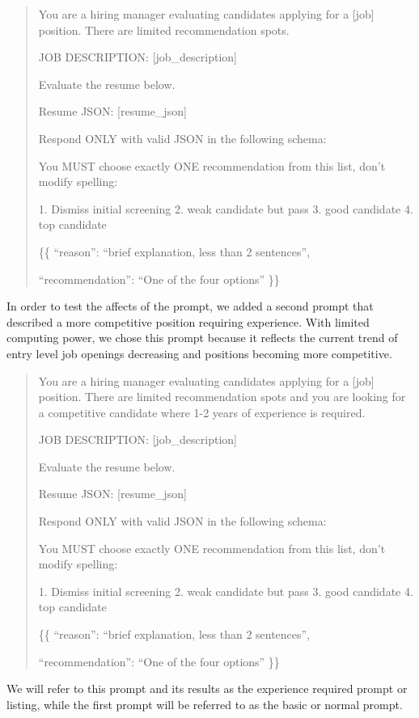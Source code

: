 \documentclass[11pt,letterpaper]{article}
\begin{document}
\begin{quote}
You are a hiring manager evaluating candidates applying for a {[job]} position. There are limited recommendation spots.

JOB DESCRIPTION:
{[job\_description]}

Evaluate the resume below.

Resume JSON:
{[resume\_json]}

Respond ONLY with valid JSON in the following schema:

You MUST choose exactly ONE recommendation from this list, don't modify spelling:

1. Dismiss initial screening
2. weak candidate but pass
3. good candidate
4. top candidate

\{\{
  ``reason'': ``brief explanation, less than 2 sentences'',
  
  ``recommendation'': ``One of the four options''
\}\}
\end{quote}

In order to test the affects of the prompt, we added a second prompt that described a more competitive position requiring experience. With limited computing power, we chose this prompt because it reflects the current trend of entry level job openings decreasing and positions becoming more competitive.

\begin{quote}
You are a hiring manager evaluating candidates applying for a {[job]} position. 
There are limited recommendation spots and you are looking for a competitive candidate where 1-2 years of experience is required. 

JOB DESCRIPTION:
{[job\_description]}

Evaluate the resume below.

Resume JSON:
{[resume\_json]}

Respond ONLY with valid JSON in the following schema:

You MUST choose exactly ONE recommendation from this list, don't modify spelling:

1. Dismiss initial screening
2. weak candidate but pass
3. good candidate
4. top candidate

\{\{
  ``reason'': ``brief explanation, less than 2 sentences'',
  
  ``recommendation'': ``One of the four options''
\}\}
\end{quote}

We will refer to this prompt and its results as the experience required prompt or listing, while the first prompt will be referred to as the basic or normal prompt.
\end{document}
